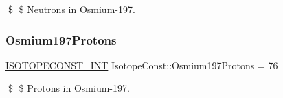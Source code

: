 \$ \$ Neutrons in Osmium-\/197. \mbox{\label{group___isotope_const-_osmium-_os197_ga89cab8aad4ee164ebedf38b4e435d07c}} 
\subsubsection{\texorpdfstring{Osmium197\+Protons}{Osmium197Protons}}
{\footnotesize\ttfamily \mbox{\hyperlink{group___isotope_const-_macros_ga5f18360b3e99483a35c32d789e62621c}{I\+S\+O\+T\+O\+P\+E\+C\+O\+N\+S\+T\+\_\+\+I\+NT}} Isotope\+Const\+::\+Osmium197\+Protons = 76}

\$ \$ Protons in Osmium-\/197. 